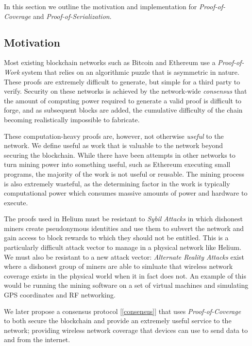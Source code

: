 \documentclass[letterpaper,11pt]{article}
\def\proofofcoverage/{\emph{Proof-of-Coverage}}
\begin{document}
In this section we outline the motivation and implementation for \proofofcoverage/ and \emph{Proof-of-Serialization}.

\subsection{Motivation}

Most existing blockchain networks such as Bitcoin \cite{bitcoin} and Ethereum \cite{ethereum} use a \emph{Proof-of-Work} system that relies on an algorithmic puzzle that is asymmetric in nature. These proofs are extremely difficult to generate, but simple for a third party to verify. Security on these networks is achieved by the network-wide \emph{consensus} that the amount of computing power required to generate a valid proof is difficult to forge, and as subsequent blocks are added, the cumulative difficulty of the chain becoming realistically impossible to fabricate. \newline

These computation-heavy proofs are, however, not otherwise \emph{useful} to the network. We define useful as work that is valuable to the network beyond securing the blockchain. While there have been attempts in other networks to turn mining power into something useful, such as Ethereum executing small programs, the majority of the work is not useful or reusable. The mining process is also extremely wasteful, as the determining factor in the work is typically computational power which consumes massive amounts of power and hardware to execute.\newline

The proofs used in Helium must be resistant to \emph{Sybil Attacks} in which dishonest miners create pseudonymous identities and use them to subvert the network and gain access to block rewards to which they should not be entitled. This is a particularly difficult attack vector to manage in a physical network like Helium. We must also be resistant to a new attack vector: \emph{Alternate Reality Attacks} exist where a dishonest group of miners are able to simluate that wireless network coverage exists in the physical world when it in fact does not. An example of this would be running the mining software on a set of virtual machines and simulating GPS coordinates and RF networking.\newline

We later propose a consensus protocol [\ref{consensus}] that uses \proofofcoverage/ to both secure the blockchain and provide an extremely useful service to the network; providing wireless network coverage that devices can use to send data to and from the internet.
\end{document}
